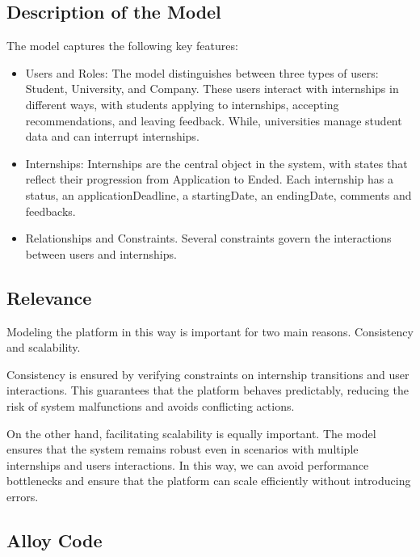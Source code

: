 \documentclass{article}
\begin{document}
\subsection{Description of the Model}
The model captures the following key features:
\begin{itemize}
    \item Users and Roles:
    The model distinguishes between three types of users: Student, University, and Company. These users interact with internships in different ways, with students applying to internships, accepting recommendations, and leaving feedback. While, universities manage student data and can interrupt internships.
    \item Internships:
    Internships are the central object in the system, with states that reflect their progression from Application to Ended. Each internship has a status, an applicationDeadline, a startingDate, an endingDate, comments and feedbacks.
    \item Relationships and Constraints.
    Several constraints govern the interactions between users and internships.
\end{itemize}
\subsection{Relevance}
Modeling the platform in this way is important for two main reasons. Consistency and scalability.

Consistency is ensured by verifying constraints on internship transitions and user interactions. This guarantees that the platform behaves predictably, reducing the risk of system malfunctions and avoids conflicting actions.

On the other hand, facilitating scalability is equally important. The model ensures that the system remains robust even in scenarios with multiple internships and users interactions. In this way, we can avoid performance bottlenecks and ensure that the platform can scale efficiently without introducing errors.
\subsection{Alloy Code}
\end{document}
